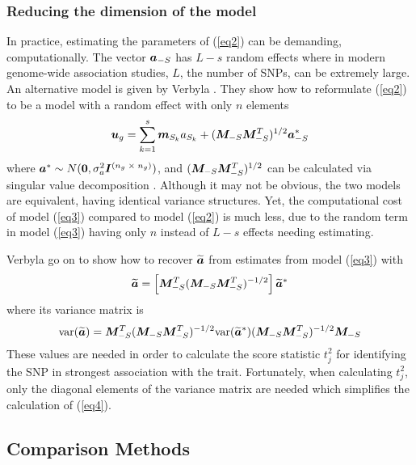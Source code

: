 \documentclass{nature}
\begin{document}
\subsubsection*{Reducing the dimension of the model}
In practice, estimating the parameters of (\ref{eq2}) can be demanding, computationally. 
The vector $\bm{a}_{-S}$ has $L-s$ random effects where in modern genome-wide association studies, 
$L$, the number of SNPs, can be extremely large.  An alternative model is given by 
Verbyla \cite{verbyla2012rwgaim,verbyla2014whole}. 
They show how to reformulate (\ref{eq2}) to be a model with a random effect with only $n$ elements
\begin{equation}
\label{eq3}
\bm{u}_g = \sum_{k=1}^s  \bm{m}_{S_k} a_{S_k} + (\bm{M}_{-S} \bm{M}_{-S}^T)^{1/2} \bm{a}^*_{-S}
\end{equation}
where $\bm{a}^* \sim N(\bm{0}, \sigma_a^2 \bm{I}^{(n_g \; \times \;  n_g)})$, and 
$(\bm{M}_{-S} \bm{M}_{-S}^T)^{1/2}$ can be calculated via singular value decomposition \cite{golub2012matrix}.  
Although it may not be obvious, the two models are equivalent, 
having identical variance structures. Yet, the computational cost of model (\ref{eq3}) compared to 
model (\ref{eq2}) is much less, due to the random term in model (\ref{eq3}) having only $n$ instead of $L-s$ 
effects needing estimating. 

Verbyla \cite{verbyla2012rwgaim,verbyla2014whole} go on to show how to recover $\widetilde{\bm{a}}$ from estimates from model  (\ref{eq3})  with 
\begin{equation}
\widetilde{\bm{a}} = \left [ \bm{M}_{-S}^T (\bm{M}_{-S} \bm{M}_{-S}^T)^{-1/2} \right ] \widetilde{\bm{a}}^*
\end{equation}
where its variance matrix is
\begin{equation}
\label{eq4}
\textrm{var}(\widetilde{\bm{a}}) = \bm{M}_{-S}^T (\bm{M}_{-S} \bm{M}_{-S}^T)^{-1/2} \textrm{var}(\widetilde{\bm{a}}^*) (\bm{M}_{-S} \bm{M}_{-S}^T)^{-1/2} \bm{M}_{-S}
\end{equation}
These values are needed in order to calculate the score statistic $t_j^2$ for identifying the SNP in strongest association with the trait. 
Fortunately, when calculating $t_j^2$, only the diagonal elements of the variance matrix are needed which simplifies the  calculation 
of (\ref{eq4}). 


\subsection{Comparison Methods}
\end{document}

